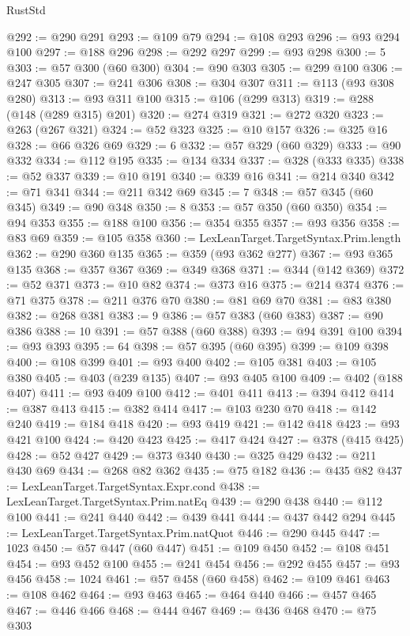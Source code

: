 \begin{lexlean}{RustStd}
\begin{coremodule}
@292 := @290 @291
@293 := @109 @79
@294 := @108 @293
@296 := @93 @294 @100
@297 := @188 @296
@298 := @292 @297
@299 := @93 @298
@300 := 5
@303 := @57 @300 (@60 @300)
@304 := @90 @303
@305 := @299 @100
@306 := @247 @305
@307 := @241 @306
@308 := @304 @307
@311 := @113 (@93 @308 @280)
@313 := @93 @311 @100
@315 := @106 (@299 @313)
@319 := @288 (@148 (@289 @315) @201)
@320 := @274 @319
@321 := @272 @320
@323 := @263 (@267 @321)
@324 := @52 @323
@325 := @10 @157
@326 := @325 @16
@328 := @66 @326 @69
@329 := 6
@332 := @57 @329 (@60 @329)
@333 := @90 @332
@334 := @112 @195
@335 := @134 @334
@337 := @328 (@333 @335)
@338 := @52 @337
@339 := @10 @191
@340 := @339 @16
@341 := @214 @340
@342 := @71 @341
@344 := @211 @342 @69
@345 := 7
@348 := @57 @345 (@60 @345)
@349 := @90 @348
@350 := 8
@353 := @57 @350 (@60 @350)
@354 := @94 @353
@355 := @188 @100
@356 := @354 @355
@357 := @93 @356
@358 := @83 @69
@359 := @105 @358
@360 := LexLeanTarget.TargetSyntax.Prim.length
@362 := @290 @360 @135
@365 := @359 (@93 @362 @277)
@367 := @93 @365 @135
@368 := @357 @367
@369 := @349 @368
@371 := @344 (@142 @369)
@372 := @52 @371
@373 := @10 @82
@374 := @373 @16
@375 := @214 @374
@376 := @71 @375
@378 := @211 @376 @70
@380 := @81 @69 @70
@381 := @83 @380
@382 := @268 @381
@383 := 9
@386 := @57 @383 (@60 @383)
@387 := @90 @386
@388 := 10
@391 := @57 @388 (@60 @388)
@393 := @94 @391 @100
@394 := @93 @393
@395 := 64
@398 := @57 @395 (@60 @395)
@399 := @109 @398
@400 := @108 @399
@401 := @93 @400
@402 := @105 @381
@403 := @105 @380
@405 := @403 (@239 @135)
@407 := @93 @405 @100
@409 := @402 (@188 @407)
@411 := @93 @409 @100
@412 := @401 @411
@413 := @394 @412
@414 := @387 @413
@415 := @382 @414
@417 := @103 @230 @70
@418 := @142 @240
@419 := @184 @418
@420 := @93 @419
@421 := @142 @418
@423 := @93 @421 @100
@424 := @420 @423
@425 := @417 @424
@427 := @378 (@415 @425)
@428 := @52 @427
@429 := @373 @340
@430 := @325 @429
@432 := @211 @430 @69
@434 := @268 @82 @362
@435 := @75 @182
@436 := @435 @82
@437 := LexLeanTarget.TargetSyntax.Expr.cond
@438 := LexLeanTarget.TargetSyntax.Prim.natEq
@439 := @290 @438
@440 := @112 @100
@441 := @241 @440
@442 := @439 @441
@444 := @437 @442 @294
@445 := LexLeanTarget.TargetSyntax.Prim.natQuot
@446 := @290 @445
@447 := 1023
@450 := @57 @447 (@60 @447)
@451 := @109 @450
@452 := @108 @451
@454 := @93 @452 @100
@455 := @241 @454
@456 := @292 @455
@457 := @93 @456
@458 := 1024
@461 := @57 @458 (@60 @458)
@462 := @109 @461
@463 := @108 @462
@464 := @93 @463
@465 := @464 @440
@466 := @457 @465
@467 := @446 @466
@468 := @444 @467
@469 := @436 @468
@470 := @75 @303

\end{coremodule}
\end{lexlean}
